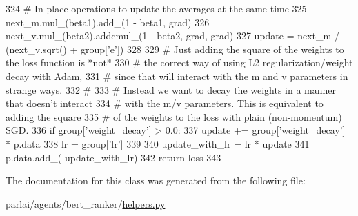 \begin{DoxyCode}
324                 \textcolor{comment}{# In-place operations to update the averages at the same time}
325                 next\_m.mul\_(beta1).add\_(1 - beta1, grad)
326                 next\_v.mul\_(beta2).addcmul\_(1 - beta2, grad, grad)
327                 update = next\_m / (next\_v.sqrt() + group[\textcolor{stringliteral}{'e'}])
328 
329                 \textcolor{comment}{# Just adding the square of the weights to the loss function is *not*}
330                 \textcolor{comment}{# the correct way of using L2 regularization/weight decay with Adam,}
331                 \textcolor{comment}{# since that will interact with the m and v parameters in strange ways.}
332                 \textcolor{comment}{#}
333                 \textcolor{comment}{# Instead we want to decay the weights in a manner that doesn't interact}
334                 \textcolor{comment}{# with the m/v parameters. This is equivalent to adding the square}
335                 \textcolor{comment}{# of the weights to the loss with plain (non-momentum) SGD.}
336                 \textcolor{keywordflow}{if} group[\textcolor{stringliteral}{'weight\_decay'}] > 0.0:
337                     update += group[\textcolor{stringliteral}{'weight\_decay'}] * p.data
338                 lr = group[\textcolor{stringliteral}{'lr'}]
339 
340                 update\_with\_lr = lr * update
341                 p.data.add\_(-update\_with\_lr)
342         \textcolor{keywordflow}{return} loss
343 \end{DoxyCode}


The documentation for this class was generated from the following file\+:\begin{DoxyCompactItemize}
\item 
parlai/agents/bert\+\_\+ranker/\hyperlink{helpers_8py}{helpers.\+py}\end{DoxyCompactItemize}
